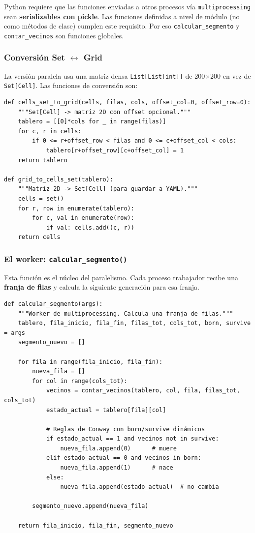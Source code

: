 \documentclass[12pt,a4paper]{article}
\begin{document}
Python requiere que las funciones enviadas a otros procesos vía \texttt{multiprocessing}
sean \textbf{serializables con pickle}. Las funciones definidas a nivel de módulo
(no como métodos de clase) cumplen este requisito. Por eso \texttt{calcular\_segmento}
y \texttt{contar\_vecinos} son funciones globales.

\subsubsection{Conversión Set $\leftrightarrow$ Grid}

La versión paralela usa una matriz densa \texttt{List[List[int]]} de 200$\times$200
en vez de \texttt{Set[Cell]}. Las funciones de conversión son:

\begin{lstlisting}
def cells_set_to_grid(cells, filas, cols, offset_col=0, offset_row=0):
    """Set[Cell] -> matriz 2D con offset opcional."""
    tablero = [[0]*cols for _ in range(filas)]
    for c, r in cells:
        if 0 <= r+offset_row < filas and 0 <= c+offset_col < cols:
            tablero[r+offset_row][c+offset_col] = 1
    return tablero

def grid_to_cells_set(tablero):
    """Matriz 2D -> Set[Cell] (para guardar a YAML)."""
    cells = set()
    for r, row in enumerate(tablero):
        for c, val in enumerate(row):
            if val: cells.add((c, r))
    return cells
\end{lstlisting}

\subsubsection{El worker: \texttt{calcular\_segmento()}}

Esta función es el núcleo del paralelismo. Cada proceso trabajador recibe
una \textbf{franja de filas} y calcula la siguiente generación para esa franja.

\begin{lstlisting}
def calcular_segmento(args):
    """Worker de multiprocessing. Calcula una franja de filas."""
    tablero, fila_inicio, fila_fin, filas_tot, cols_tot, born, survive = args
    segmento_nuevo = []

    for fila in range(fila_inicio, fila_fin):
        nueva_fila = []
        for col in range(cols_tot):
            vecinos = contar_vecinos(tablero, col, fila, filas_tot, cols_tot)
            estado_actual = tablero[fila][col]

            # Reglas de Conway con born/survive dinámicos
            if estado_actual == 1 and vecinos not in survive:
                nueva_fila.append(0)      # muere
            elif estado_actual == 0 and vecinos in born:
                nueva_fila.append(1)      # nace
            else:
                nueva_fila.append(estado_actual)  # no cambia

        segmento_nuevo.append(nueva_fila)

    return fila_inicio, fila_fin, segmento_nuevo
\end{lstlisting}
\end{document}

